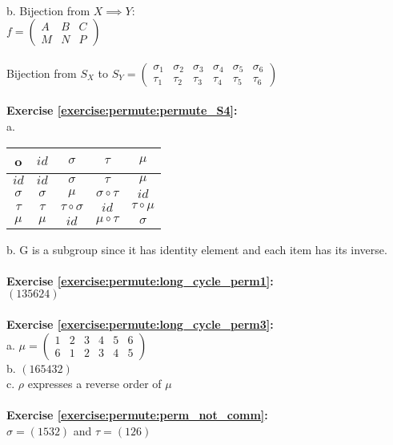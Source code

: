\hfill\\
b. Bijection from $X\implies Y$:\\
$f=\begin{pmatrix}
A & B & C\\
M & N & P
\end{pmatrix}$\\
\\
Bijection from $S_X$ to $S_Y=\begin{pmatrix}
\sigma_1 & \sigma_2 & \sigma_3 & \sigma_4 & \sigma_5 & \sigma_6\\
\tau_1 & \tau_2 & \tau_3 & \tau_4 & \tau_5 & \tau_6
\end{pmatrix}$\\
\\
\textbf{Exercise \ref{exercise:permute:permute_S4}:}\\
a.
\begin{center}
	\begin{tabular}{c| c c c c}
		o & $id$ & $\sigma$ & $\tau$ & $\mu$\\
		\hline
		$id$ & $id$ & $\sigma$ & $\tau$ & $\mu$\\
		$\sigma$ & $\sigma$ & $\mu$ & $\sigma\circ\tau$ & $id$\\
		$\tau$ & $\tau$ & $\tau\circ\sigma$ & $id$ & $\tau\circ\mu$\\
		$\mu$ & $\mu$ & $id$ & $\mu\circ\tau$ & $\sigma$\\
	\end{tabular}
\end{center}
b. G is a subgroup since it has identity element and each item has its inverse.\\
\\
\textbf{Exercise \ref{exercise:permute:long_cycle_perm1}:}\\
$(135624)$\\
\\
\textbf{Exercise \ref{exercise:permute:long_cycle_perm3}:}\\
a. $\mu=\begin{pmatrix}
1 & 2 & 3 & 4 & 5 & 6\\
6 & 1 & 2 & 3 & 4 & 5
\end{pmatrix}$\\
b. $(165432)$\\
c. $\rho$ expresses a reverse order of $\mu$\\
\\
\textbf{Exercise \ref{exercise:permute:perm_not_comm}:}\\
$\sigma=(1532)$ and $\tau=(126)$\\
